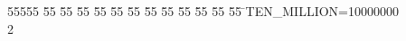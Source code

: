 %
%
\begin{tabbing}
55555 \= 55 \= 55 \= 55 \= 55 \= 55 \= 55 \= 55 \= 55 \= 55 \= 55 \= 55 \= 55 \= \>TEN\_MILLION=10000000\\[0pt]
2\>\end{tabbing}

